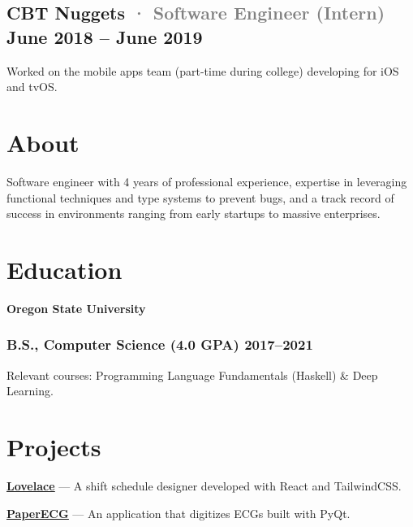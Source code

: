 \documentclass[10pt]{article} %
\let\defaultref\href
\renewcommand{\href}[2]{%
  \defaultref{#1}{\ul{#2}}%
}
\renewcommand{\emph}[1]{%
  \textcolor{gray}{#1}%
}
\begin{document}
\begin{paracol}{2}
{\subsection{\texorpdfstring{CBT Nuggets \emph{· \small Software Engineer
(Intern)} \hfill \small June 2018 -- June
2019}{CBT Nuggets · Software Engineer (Intern) June 2018 -- June 2019}}\label{cbt-nuggets-software-engineer-intern-june-2018-june-2019}}

Worked on the mobile apps team (part-time during college) developing for
iOS and tvOS.

\switchcolumn

\hypertarget{about}{%
\section{About}\label{about}}

Software engineer with 4 years of professional experience, expertise in
leveraging functional techniques and type systems to prevent bugs, and a
track record of success in environments ranging from early startups to
massive enterprises.

\raggedright

\hypertarget{education}{%
\section{Education}\label{education}}

\textbf{Oregon State University}

\hypertarget{b.s.-computer-science-4.0-gpa-20172021}{%
\subsubsection{B.S., Computer Science (4.0 GPA)
2017--2021}\label{b.s.-computer-science-4.0-gpa-20172021}}

Relevant courses: Programming Language Fundamentals (Haskell) \& Deep
Learning.

\hypertarget{projects}{%
\section{Projects}\label{projects}}

\textbf{\href{http://julianfortune.com/lovelace/}{Lovelace}} --- A shift
schedule designer developed with React and TailwindCSS.

\textbf{\href{https://github.com/Tereshchenkolab/paper-ecg}{PaperECG}}
--- An application that digitizes ECGs built with PyQt.


\end{paracol}
\end{document}
